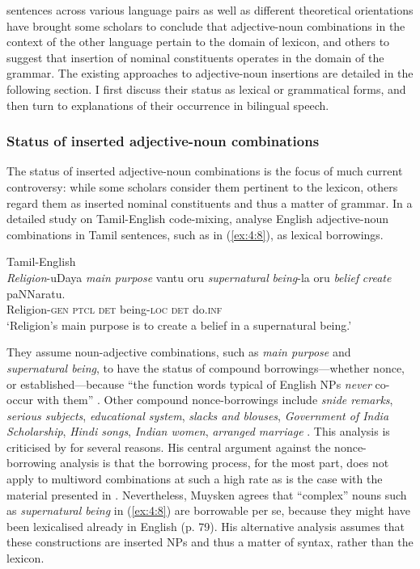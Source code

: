 sentences across various language pairs as well as different theoretical orientations have brought some scholars to conclude that adjective-noun combinations in the context of the other language pertain to the domain of  lexicon, and others to suggest that insertion of nominal constituents operates in the domain of the grammar. The existing approaches to adjective-noun insertions are detailed in the following section. I first discuss their status as lexical or grammatical forms, and then turn to explanations of their occurrence in bilingual speech.

\subsubsection{Status of inserted adjective-noun combinations}
The status of inserted adjective-noun combinations is the focus of much current controversy: while some scholars consider them pertinent to the lexicon, others regard them as inserted nominal constituents and thus a matter of grammar. In a detailed study on Tamil-English code-mixing, \citet{sankoff-et-al-1990} analyse English adjective-noun combinations in Tamil sentences, such as in (\ref{ex:4:8}), as lexical borrowings.

\ea{\label{ex:4:8}}
Tamil-English \citep[96]{sankoff-et-al-1990}\\
\gll \textit{Religion}-uDaya \textit{main purpose} vantu oru \textit{supernatural} \textit{being}-la oru \textit{belief} \textit{create} paNNaratu.\\
	\textcolor[rgb]{1,1,1}{Religion}-\textsc{gen} {} \textsc{ptcl} \textsc{det} {} \textcolor[rgb]{1,1,1}{being}-\textsc{loc} \textsc{det} {} {} do.\textsc{inf}\\
\glt `Religion's main purpose is to create a belief in a supernatural being.'
\z

\noindent They assume noun-adjective combinations, such as \textit{main purpose} and \textit{supernatural being}, to have the status of compound borrowings---whether nonce, or established---because ``the function words typical of English NPs \textit{never} co-occur with them'' \citep[80, emphasis in the original]{sankoff-et-al-1990}. Other compound nonce-borrowings include \textit{snide remarks}, \textit{serious subjects}, \textit{educational system}, \textit{slacks and blouses}, \textit{Government of India Scholarship}, \textit{Hindi songs}, \textit{Indian women}, \textit{arranged marriage} \citep[80, passim]{sankoff-et-al-1990}. This analysis is criticised by \citet[78-81]{muysken-bilingual-2000} for several reasons. His central argument against the nonce-borrowing analysis is that the borrowing process, for the most part, does not apply to multiword combinations at such a high rate as is the case with the material presented in \citet{sankoff-et-al-1990}. Nevertheless, Muysken agrees that ``complex'' nouns such as \textit{supernatural being} in (\ref{ex:4:8}) are borrowable per se, because they might have been lexicalised already in English (p. 79). His alternative  analysis assumes that these constructions are inserted NPs and thus a matter of syntax, rather than the lexicon.

